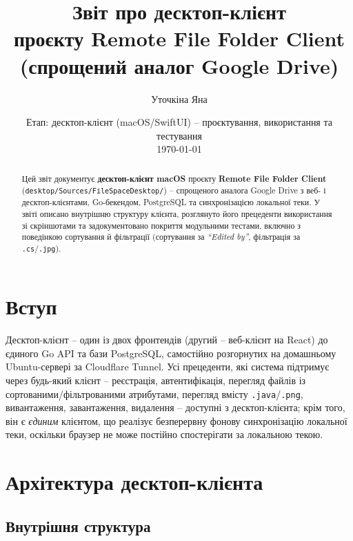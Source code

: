 \documentclass[12pt,a4paper]{article}
\title{\textbf{Звіт про десктоп-клієнт\\[2pt] \large проєкту Remote File Folder Client\\(спрощений аналог Google Drive)}}
\author{Уточкіна Яна}
\date{Етап: десктоп-клієнт (macOS/SwiftUI) -- проєктування, використання та тестування \\ \today}
\begin{document}
\maketitle

\begin{abstract}
\noindent
Цей звіт документує \textbf{десктоп-клієнт macOS} проєкту \textbf{Remote File Folder Client} (\texttt{desktop/Sources/FileSpaceDesktop/}) -- спрощеного аналога Google Drive з веб- і десктоп-клієнтами, Go-бекендом, PostgreSQL та синхронізацією локальної теки. У звіті описано внутрішню структуру клієнта, розглянуто його прецеденти використання зі скріншотами та задокументовано покриття модульними тестами, включно з поведінкою сортування й фільтрації (сортування за \emph{``Edited by''}, фільтрація за \texttt{.cs}/\texttt{.jpg}).
\end{abstract}

\tableofcontents
\newpage

\section{Вступ}

Десктоп-клієнт -- один із двох фронтендів (другий -- веб-клієнт на React) до єдиного Go API та бази PostgreSQL, самостійно розгорнутих на домашньому Ubuntu-сервері за Cloudflare Tunnel. Усі прецеденти, які система підтримує через будь-який клієнт -- реєстрація, автентифікація, перегляд файлів із сортованими/фільтрованими атрибутами, перегляд вмісту \texttt{.java}/\texttt{.png}, вивантаження, завантаження, видалення -- доступні з десктоп-клієнта; крім того, він є \emph{єдиним} клієнтом, що реалізує безперервну фонову синхронізацію локальної теки, оскільки браузер не може постійно спостерігати за локальною текою.

\section{Архітектура десктоп-клієнта}

\subsection{Внутрішня структура}
\end{document}
